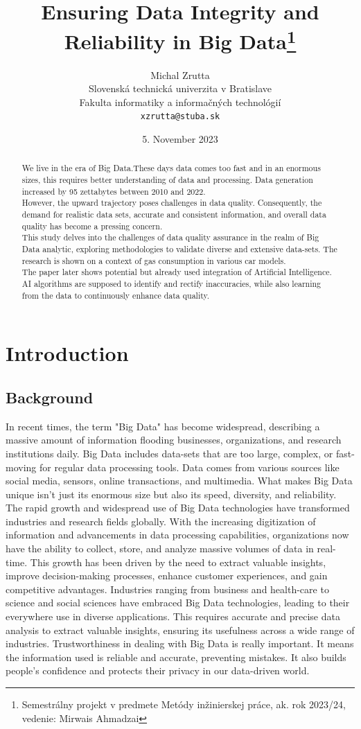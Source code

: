 \documentclass[10pt,a4paper]{article}
\title{Ensuring Data Integrity and Reliability in Big Data\thanks{Semestrálny projekt v predmete Metódy inžinierskej práce, ak. rok 2023/24, vedenie: Mirwais Ahmadzai}}
\author{Michal Zrutta \\[2pt]
	{\small Slovenská technická univerzita v Bratislave}\\
	{\small Fakulta informatiky a informačných technológií}\\
	{\small \texttt{xzrutta@stuba.sk}}
}
\date{\small 5. November 2023}
\newcommand{\parindentplus}{\hspace*{\parindent}\vspace{0em}}
\begin{document}
\maketitle

\begin{abstract}
\parindentplus We live in the era of Big Data.These days data comes too fast and in an enormous sizes, this requires better understanding of data and processing. Data generation increased by 95 zettabytes between 2010 and 2022.\\ \parindentplus However, the upward trajectory poses challenges in data quality. Consequently, the demand for realistic data sets, accurate and consistent information, and overall data quality has become a pressing concern.\\ \parindentplus This study delves into the challenges of data quality assurance in the realm of Big Data analytic, exploring methodologies to validate diverse and extensive data-sets. The research is shown on a context of gas consumption in various car models.\\ \parindentplus The paper later shows potential but already used integration of Artificial Intelligence. AI algorithms are supposed to identify and rectify inaccuracies, while also learning from the data to continuously enhance data quality.
\end{abstract}
\section{Introduction}
\subsection{Background}
In recent times, the term "Big Data" has become widespread, describing a massive amount of information flooding businesses, organizations, and research institutions daily. Big Data includes data-sets that are too large, complex, or fast-moving for regular data processing tools. Data comes from various sources like social media, sensors, online transactions, and multimedia. What makes Big Data unique isn't just its enormous size but also its speed, diversity, and reliability.\cite{gudivada2015big}
The rapid growth and widespread use of Big Data technologies have transformed industries and research fields globally. With the increasing digitization of information and advancements in data processing capabilities, organizations now have the ability to collect, store, and analyze massive volumes of data in real-time. This growth has been driven by the need to extract valuable insights, improve decision-making processes, enhance customer experiences, and gain competitive advantages. Industries ranging from business and health-care to science and social sciences have embraced Big Data technologies, leading to their everywhere use in diverse applications.\cite{anisetti2023assurance}
This requires accurate and precise data analysis to extract valuable insights, ensuring its usefulness across a wide range of industries. Trustworthiness in dealing with Big Data is really important. It means the information used is reliable and accurate, preventing mistakes. It also builds people's confidence and protects their privacy in our data-driven world.\cite{anisetti2023assurance}
\end{document}
